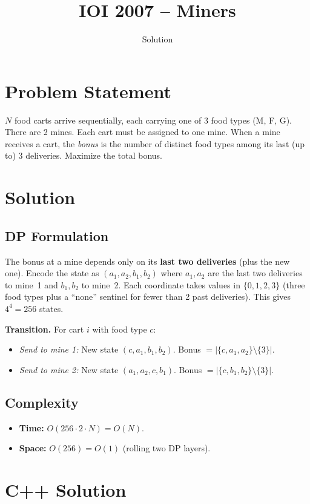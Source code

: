 \documentclass[11pt,a4paper]{article}
\title{IOI 2007 -- Miners}
\author{Solution}
\date{}
\begin{document}
\maketitle

\section{Problem Statement}
$N$ food carts arrive sequentially, each carrying one of 3 food types (M, F, G). There are 2 mines. Each cart must be assigned to one mine. When a mine receives a cart, the \emph{bonus} is the number of distinct food types among its last (up to) 3 deliveries. Maximize the total bonus.

\section{Solution}

\subsection{DP Formulation}
The bonus at a mine depends only on its \textbf{last two deliveries} (plus the new one). Encode the state as $(a_1, a_2, b_1, b_2)$ where $a_1, a_2$ are the last two deliveries to mine~1 and $b_1, b_2$ to mine~2. Each coordinate takes values in $\{0,1,2,3\}$ (three food types plus a ``none'' sentinel for fewer than 2 past deliveries). This gives $4^4 = 256$ states.

\textbf{Transition.} For cart $i$ with food type $c$:
\begin{itemize}
    \item \emph{Send to mine 1:} New state $(c, a_1, b_1, b_2)$. Bonus $= |\{c, a_1, a_2\} \setminus \{3\}|$.
    \item \emph{Send to mine 2:} New state $(a_1, a_2, c, b_1)$. Bonus $= |\{c, b_1, b_2\} \setminus \{3\}|$.
\end{itemize}

\subsection{Complexity}
\begin{itemize}
    \item \textbf{Time:} $O(256 \cdot 2 \cdot N) = O(N)$.
    \item \textbf{Space:} $O(256) = O(1)$ (rolling two DP layers).
\end{itemize}

\section{C++ Solution}
\end{document}
